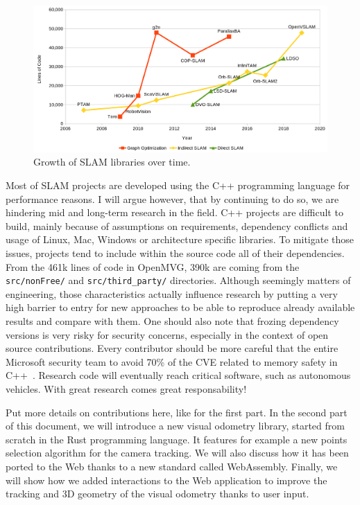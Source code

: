 \begin{figure}[h]
	\centering
	\includegraphics[width=\linewidth]{assets/img/slam-cloc.png}
	\caption{Growth of SLAM libraries over time.}%
	\label{fig:assets/img/slam-cloc}
\end{figure}

Most of SLAM projects are developed using the C++ programming language for performance reasons.
I will argue however, that by continuing to do so, we are hindering mid and long-term research
in the field.
C++ projects are difficult to build, mainly because of assumptions on requirements,
dependency conflicts and usage of Linux, Mac, Windows or architecture specific libraries.
To mitigate those issues, projects tend to include within the source code all of their dependencies.
From the 461k lines of code in OpenMVG, 390k are coming from the \verb|src/nonFree/|
and \verb|src/third_party/| directories.
Although seemingly matters of engineering, those characteristics actually influence research
by putting a very high barrier to entry for new approaches to be able
to reproduce already available results and compare with them.
One should also note that frozing dependency versions is very risky for security concerns,
especially in the context of open source contributions.
Every contributor should be more careful that the entire Microsoft security team
to avoid 70\% of the CVE related to memory safety in C++~\cite{msrc-safer}.
Research code will eventually reach critical software, such as autonomous vehicles.
With great research comes great responsability!

\alert{Put more details on contributions here, like for the first part.}
In the second part of this document, we will introduce a new visual odometry library,
started from scratch in the Rust programming language.
It features for example a new points selection algorithm for the camera tracking.
We will also discuss how it has been ported to the Web thanks to a new standard called WebAssembly.
Finally, we will show how we added interactions to the Web application
to improve the tracking and 3D geometry of the visual odometry thanks to user input.
